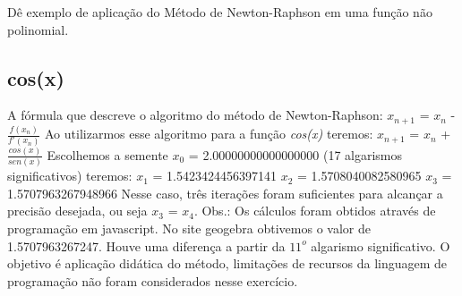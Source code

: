 Dê exemplo de aplicação do Método de Newton-Raphson em uma função não polinomial.

\subsection{cos(x)}
A fórmula que descreve o algoritmo do método de Newton-Raphson: $x_{n+1}$ = $x_{n}$ - $\frac{f(x_{n})}{f'(x_n)}$
\newline
Ao utilizarmos esse algoritmo para a função \textit{cos(x)} teremos: $x_{n+1}$ = $x_{n}$ + $\frac{cos(x)}{sen(x)}$
\newline
Escolhemos a semente $x_0$ = 2.00000000000000000 (17 algarismos significativos) teremos: \newline
$x_1$ = 1.5423424456397141 \newline
$x_2$ = 1.5708040082580965 \newline
$x_3$ = 1.5707963267948966 \newline
Nesse caso, três iterações foram suficientes para alcançar a precisão desejada, ou seja $x_3$ = $x_4$. \newline
Obs.: Os cálculos foram obtidos através de programação em javascript. No site geogebra obtivemos o valor de 1.5707963267247. Houve uma diferença a partir da $11^{o}$ algarismo significativo. O objetivo é aplicação didática do método, limitações de recursos da linguagem de programação não foram considerados nesse exercício.